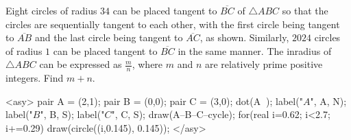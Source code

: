 Eight circles of radius $34$ can be placed tangent to $\overline{BC}$ of $\triangle ABC$ so that the circles are sequentially tangent to each other, with the first circle being tangent to $\overline{AB}$ and the last circle being tangent to $\overline{AC}$, as shown. Similarly, $2024$ circles of radius $1$ can be placed tangent to $\overline{BC}$ in the same manner. The inradius of $\triangle ABC$ can be expressed as $\frac{m}{n}$, where $m$ and $n$ are relatively prime positive integers. Find $m+n$.

<asy>
pair A = (2,1); pair B = (0,0); pair C = (3,0);
dot(A^^B^^C);
label("$A$", A, N); label("$B$", B, S); label("$C$", C, S);
draw(A--B--C--cycle);
for(real i=0.62; i<2.7; i+=0.29){
draw(circle((i,0.145), 0.145));
}
</asy>
